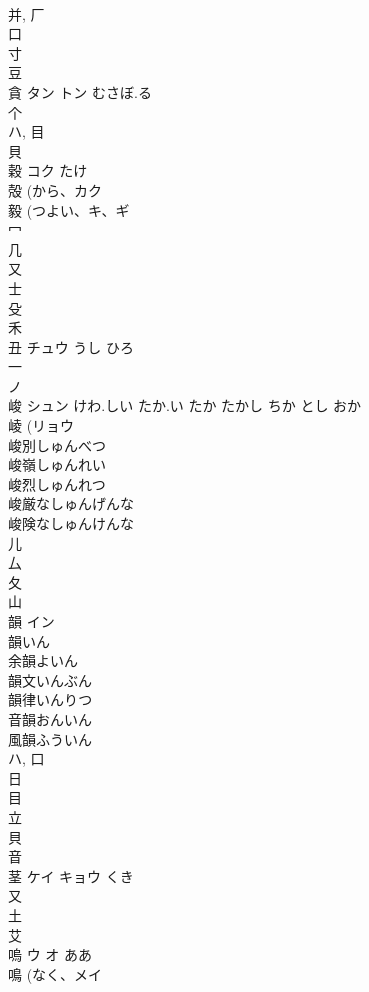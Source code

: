 \documentclass[8pt]{extreport}
\begin{document}
\begin{CJK}{UTF8}{min}
\\	并, 厂 
\\	口 
\\	寸 
\\	豆 
\\	貪	タン トン	むさぼ.る	
\\	个 
\\	ハ, 目 
\\	貝 
\\	穀	コク	たけ	
\\	殻 (から、カク 
\\	毅 (つよい、キ、ギ 
\\	冖 
\\	几 
\\	又 
\\	士 
\\	殳 
\\	禾 
\\	丑	チュウ	うし ひろ	
\\	一 
\\	ノ	
\\	峻	シュン	けわ.しい たか.い たか たかし ちか とし おか	
\\	崚 (リョウ 
\\	峻別しゅんべつ
\\	峻嶺しゅんれい
\\	峻烈しゅんれつ
\\	峻厳なしゅんげんな
\\	峻険なしゅんけんな
\\	儿 
\\	厶 
\\	夂 
\\	山 
\\	韻	イン		
\\	韻いん 
\\	余韻よいん 
\\	韻文いんぶん 
\\	韻律いんりつ 
\\	音韻おんいん 
\\	風韻ふういん 
\\	ハ, 口 
\\	日 
\\	目 
\\	立 
\\	貝 
\\	音 
\\	茎	ケイ キョウ	くき	
\\	又 
\\	土 
\\	艾 
\\	嗚	ウ オ	ああ	
\\	鳴 (なく、メイ 

\end{CJK}
\end{document}
